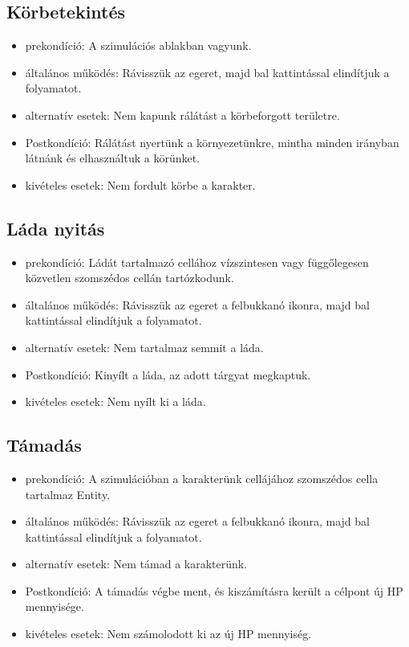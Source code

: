 \subsection{Körbetekintés}

\begin{itemize}
    \item prekondíció: A szimulációs ablakban vagyunk.
    \item általános működés: Rávisszük az egeret, majd bal kattintással elindítjuk a folyamatot.
    \item alternatív esetek: Nem kapunk rálátást a körbeforgott területre.
    \item Postkondíció: Rálátást nyertünk a környezetünkre, mintha minden irányban látnánk és elhasználtuk a körünket.
    \item kivételes esetek: Nem fordult körbe a karakter.
\end{itemize}

\subsection{Láda nyitás}

\begin{itemize}
    \item prekondíció: Ládát tartalmazó cellához vízszintesen vagy függőlegesen közvetlen szomszédos cellán tartózkodunk.
    \item általános működés: Rávisszük az egeret a felbukkanó ikonra, majd bal kattintással elindítjuk a folyamatot.
    \item alternatív esetek: Nem tartalmaz semmit a láda.
    \item Postkondíció: Kinyílt a láda, az adott tárgyat megkaptuk.
    \item kivételes esetek: Nem nyílt ki a láda.
\end{itemize}

\subsection{Támadás}

\begin{itemize}
    \item prekondíció: A szimulációban a karakterünk cellájához szomszédos cella tartalmaz Entity.
    \item általános működés: Rávisszük az egeret a felbukkanó ikonra, majd bal kattintással elindítjuk a folyamatot.
    \item alternatív esetek: Nem támad a karakterünk.
    \item Postkondíció: A támadás végbe ment, és kiszámításra került a célpont új HP mennyisége.
    \item kivételes esetek: Nem számolodott ki az új HP mennyiség.
\end{itemize}

